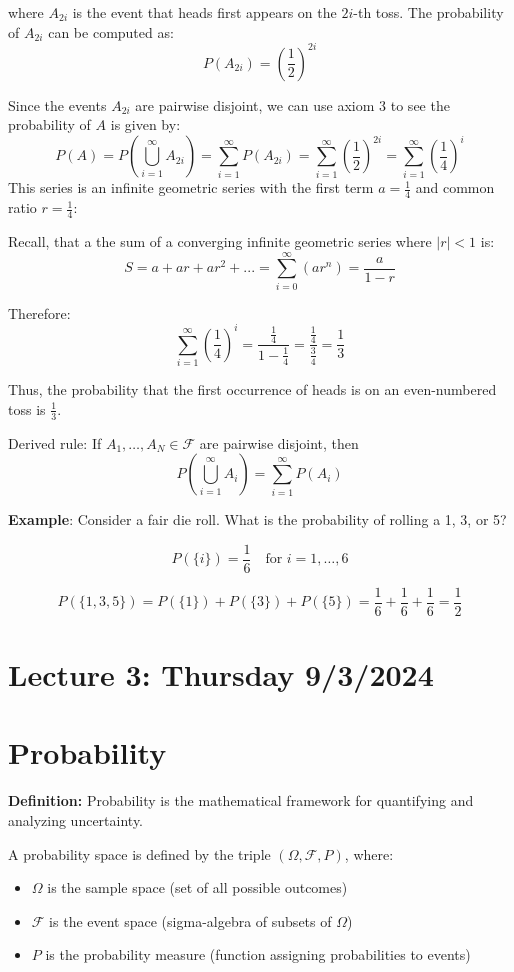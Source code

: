 \documentclass{article}
\begin{document}
where \( A_{2i} \) is the event that heads first appears on the \( 2i \)-th toss. The probability of \( A_{2i} \) can be computed as:
\[
P(A_{2i}) = \left(\frac{1}{2}\right)^{2i}
\]

Since the events \( A_{2i} \) are pairwise disjoint, we can use axiom 3 to see the probability of \( A \) is given by:
\[
P(A) = P\left(\bigcup_{i=1}^{\infty} A_{2i}\right)
= \sum_{i=1}^{\infty} P(A_{2i}) 
= \sum_{i=1}^{\infty} \left(\frac{1}{2}\right)^{2i} = \sum_{i=1}^{\infty} \left(\frac{1}{4}\right)^{i}
\]
This series is an infinite geometric series with the first term \( a = \frac{1}{4} \) and common ratio \( r = \frac{1}{4} \): 

Recall, that a the sum of a converging infinite geometric series where \(|r| < 1\) is:
\[
S = a+ar+ar^2+... = \sum_{i=0}^{\infty} \left(ar^n\right) = \frac{a}{1 - r}
\]

Therefore:
\[
\sum_{i=1}^{\infty} \left(\frac{1}{4}\right)^i = \frac{\frac{1}{4}}{1 - \frac{1}{4}} = \frac{\frac{1}{4}}{\frac{3}{4}} = \frac{1}{3}
\]

Thus, the probability that the first occurrence of heads is on an even-numbered toss is \( \boxed{\frac{1}{3}} \).


Derived rule: If \( A_1, \dots, A_N \in \mathcal{F} \) are pairwise disjoint, then 
\[
P\left(\bigcup_{i=1}^{\infty} A_i\right) = \sum_{i=1}^{\infty} P(A_i)
\]

\textbf{Example}: Consider a fair die roll. What is the probability of rolling a 1, 3, or 5?

\[
P(\{i\}) = \frac{1}{6} \quad \text{for } i = 1, \dots, 6
\]

\[
P(\{1, 3, 5\}) = P(\{1\}) + P(\{3\}) + P(\{5\}) = \frac{1}{6} + \frac{1}{6} + \frac{1}{6} = \frac{1}{2}
\]

\pagebreak
\section*{Lecture 3: Thursday 9/3/2024}
\section{Probability}

\textbf{Definition:} Probability is the mathematical framework for quantifying and analyzing uncertainty.

A probability space is defined by the triple \( (\Omega, \mathcal{F}, P) \), where:
\begin{itemize}
    \item \( \Omega \) is the sample space (set of all possible outcomes)
    \item \( \mathcal{F} \) is the event space (sigma-algebra of subsets of \( \Omega \))
    \item \( P \) is the probability measure (function assigning probabilities to events)
\end{itemize}
\end{document}

